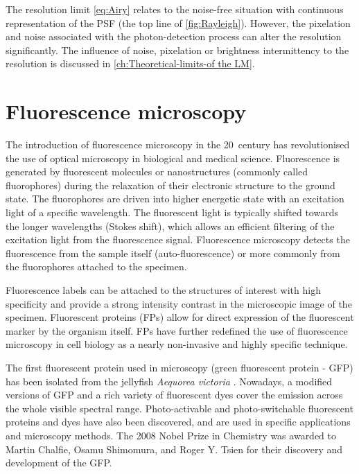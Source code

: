 The resolution limit \autoref{eq:Airy} relates to the noise-free situation with continuous representation of the PSF (the top line of \autoref{fig:Rayleigh}). However, the pixelation and noise associated with the photon-detection process can alter the resolution significantly. The influence of noise, pixelation or brightness intermittency to the resolution is discussed in \autoref{ch:Theoretical-limits-of the LM}. 


\section{Fluorescence microscopy\label{sec:Fluorescence microscopy}}

The introduction of fluorescence microscopy in the 20\ths\ century has revolutionised the use of optical microscopy in biological and medical science. Fluorescence is generated by fluorescent molecules or nanostructures (commonly called fluorophores) during the relaxation of their electronic structure to the ground state.  The fluorophores are driven into higher energetic state with an excitation light of a specific wavelength. The fluorescent light is typically shifted towards the longer wavelengths (Stokes shift),  which allows an efficient filtering of the excitation light from the fluorescence signal. Fluorescence microscopy detects the fluorescence from the sample itself (auto-fluorescence) or more commonly from the fluorophores attached to the specimen.

Fluorescence labels can be attached to the structures of interest with high specificity and provide a strong intensity contrast in the microscopic image of the specimen. Fluorescent proteins (FPs) allow for direct expression of the fluorescent marker by the organism itself. FPs have further redefined the use of fluorescence microscopy in cell biology as a nearly non-invasive and highly specific technique. 

The first fluorescent protein used in microscopy (green fluorescent protein - GFP) has been isolated from the jellyfish {\it Aequorea victoria} \cite{Tsien1998}. Nowadays, a modified versions of GFP and a rich variety of fluorescent dyes cover the emission across the whole visible spectral range. Photo-activable and photo-switchable fluorescent proteins and dyes have also been discovered, and are used in specific applications and microscopy methods. The 2008 Nobel Prize in Chemistry was awarded to Martin Chalfie, Osamu Shimomura, and Roger Y. Tsien for their discovery and development of the GFP.
 
